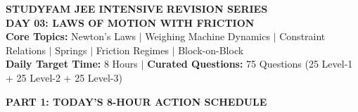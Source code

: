 \documentclass[11pt,a4paper]{article}
\begin{document}
\begin{tcolorbox}[dayheader]
\begin{center}
  {\Large \textbf{\textsf{\textcolor{goldAccent}{STUDYFAM JEE INTENSIVE REVISION SERIES}}}}\\[3pt]
  {\LARGE \textbf{\textsf{DAY 03: LAWS OF MOTION WITH FRICTION}}}\\[5pt]
  {\normalsize \textbf{\textsf{Core Topics:}} Newton's Laws $\vert$ Weighing Machine Dynamics $\vert$ Constraint Relations $\vert$ Springs $\vert$ Friction Regimes $\vert$ Block-on-Block}\\[3pt]
  {\footnotesize \textbf{Daily Target Time:} 8 Hours \quad $\vert$ \quad \textbf{Curated Questions:} 75 Questions (25 Level-1 + 25 Level-2 + 25 Level-3)}
\end{center}
\end{tcolorbox}

\vspace{6pt}

\begin{tcolorbox}[sectionbanner]
  {\large \textbf{\textsf{PART 1: TODAY'S 8-HOUR ACTION SCHEDULE}}}
\end{tcolorbox}
\vspace{2pt}
\end{document}
